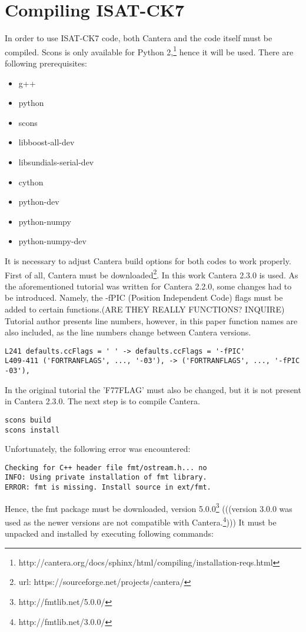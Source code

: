 \documentclass[12pt,english]{article}
\begin{document}
\section{Compiling ISAT-CK7}
In order to use ISAT-CK7 code, both Cantera and the code itself must be compiled. Scons is only available for Python 2,\footnote{http://cantera.org/docs/sphinx/html/compiling/installation-reqs.html} hence it will be used. There are following prerequisites:
\begin{itemize}
\item g++
\item python
\item scons
\item libboost-all-dev
\item libsundials-serial-dev
\item cython
\item python-dev
\item python-numpy
\item python-numpy-dev
\end{itemize}
It is necessary to adjust Cantera build options for both codes to work properly. First of all, Cantera must be downloaded\footnote{url: https://sourceforge.net/projects/cantera/}. In this work Cantera 2.3.0 is used. As the aforementioned tutorial was written for Cantera 2.2.0, some changes had to be introduced. Namely, the -fPIC (Position Independent Code) flags must be added to certain functions.(ARE THEY REALLY FUNCTIONS? INQUIRE) Tutorial author presents line numbers, however, in this paper function names are also included, as the line numbers change between Cantera versions.
\begin{lstlisting}
L241 defaults.ccFlags = ' ' -> defaults.ccFlags = '-fPIC'
L409-411 ('FORTRANFLAGS', ..., '-03'), -> ('FORTRANFLAGS', ..., '-fPIC -03'),
\end{lstlisting}
In the original tutorial the 'F77FLAG' must also be changed, but it is not present in Cantera 2.3.0. The next step is to compile Cantera.
\begin{lstlisting}
scons build
scons install
\end{lstlisting}
Unfortunately, the following error was encountered:
\begin{lstlisting}
Checking for C++ header file fmt/ostream.h... no
INFO: Using private installation of fmt library.
ERROR: fmt is missing. Install source in ext/fmt.
\end{lstlisting}
Hence, the fmt package must be downloaded,
version 5.0.0\footnote{http://fmtlib.net/5.0.0/} (((version 3.0.0 was used as the newer versions are not compatible with Cantera.\footnote{http://fmtlib.net/3.0.0/}))) It must be unpacked and installed by executing following commands:
\end{document}
